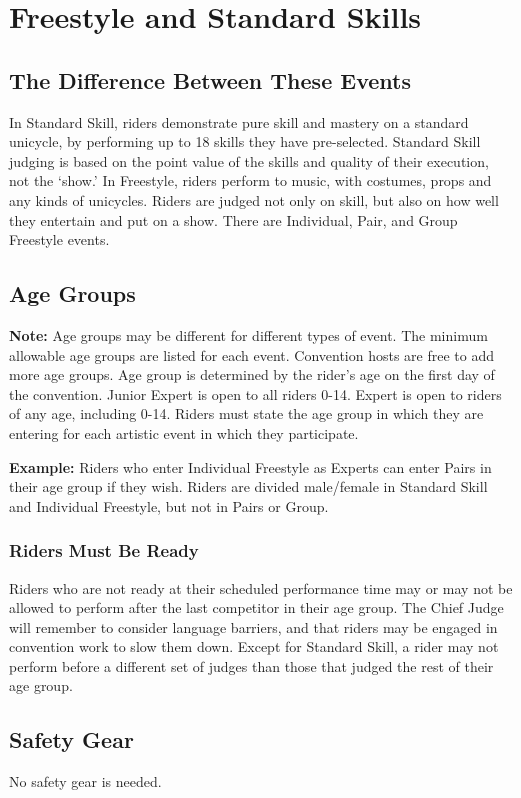 \chapter{Freestyle and Standard Skills \label{chap:freestyle}}

\section{The Difference Between These Events}
In Standard Skill, riders demonstrate pure skill and mastery on a standard unicycle, by performing up to 18 skills they have pre-selected.
Standard Skill judging is based on the point value of the skills and quality of their execution, not the ‘show.' In Freestyle, riders perform to music, with costumes, props and any kinds of unicycles.
Riders are judged not only on skill, but also on how well they entertain and put on a show.
There are Individual, Pair, and Group Freestyle events.

\section{Age Groups}
\textbf{Note:} Age groups may be different for different types of event.
The minimum allowable age groups are listed for each event.
Convention hosts are free to add more age groups.
Age group is determined by the rider's age on the first day of the convention.
Junior Expert is open to all riders 0-14.
Expert is open to riders of any age, including 0-14.
Riders must state the age group in which they are entering for each artistic event in which they participate.

\textbf{Example:} Riders who enter Individual Freestyle as Experts can enter Pairs in their age group if they wish.
Riders are divided male/female in Standard Skill and Individual Freestyle, but not in Pairs or Group.

\subsection{Riders Must Be Ready}
Riders who are not ready at their scheduled performance time may or may not be allowed to perform after the last competitor in their age group.
The Chief Judge will remember to consider language barriers, and that riders may be engaged in convention work to slow them down.
Except for Standard Skill, a rider may not perform before a different set of judges than those that judged the rest of their age group.

\section{Safety Gear}
No safety gear is needed.

